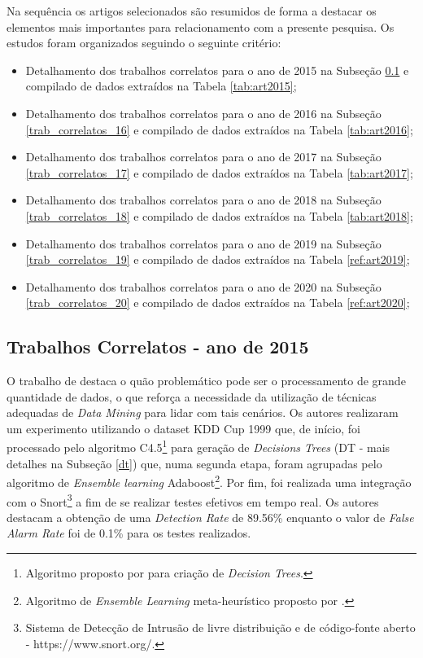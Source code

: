     
Na sequência os artigos selecionados são resumidos de forma a destacar os elementos mais importantes para relacionamento com a presente pesquisa. Os estudos foram organizados seguindo o seguinte critério:

\begin{itemize}
    \item Detalhamento dos trabalhos correlatos para o ano de 2015 na Subseção \ref{trab_correlatos_15} e compilado de dados extraídos na Tabela \ref{tab:art2015};
    

    \item Detalhamento dos trabalhos correlatos para o ano de 2016 na Subseção \ref{trab_correlatos_16} e compilado de dados extraídos na Tabela \ref{tab:art2016};
    
    \item Detalhamento dos trabalhos correlatos para o ano de 2017 na Subseção \ref{trab_correlatos_17} e compilado de dados extraídos na Tabela \ref{tab:art2017};
    
    \item Detalhamento dos trabalhos correlatos para o ano de 2018 na Subseção \ref{trab_correlatos_18} e compilado de dados extraídos na Tabela \ref{tab:art2018};
    
    \item Detalhamento dos trabalhos correlatos para o ano de 2019 na Subseção \ref{trab_correlatos_19} e compilado de dados extraídos na Tabela \ref{ref:art2019};
    
    \item Detalhamento dos trabalhos correlatos para o ano de 2020 na Subseção \ref{trab_correlatos_20} e compilado de dados extraídos na Tabela \ref{ref:art2020};
    
    
\end{itemize}
    
\subsection{Trabalhos Correlatos - ano de 2015}
\label{trab_correlatos_15}

O trabalho de  destaca o quão problemático pode ser o processamento de grande quantidade de dados, o que reforça a necessidade da utilização de técnicas adequadas de \textit{Data Mining} para lidar com tais cenários. Os autores realizaram um experimento utilizando o dataset KDD Cup 1999 que, de início, foi processado pelo algoritmo C4.5\footnote{Algoritmo proposto por  para criação de \textit{Decision Trees}.} para geração de \textit{Decisions Trees} (DT - mais detalhes na Subseção \ref{dt}) que, numa segunda etapa, foram agrupadas pelo algoritmo de \textit{Ensemble learning} Adaboost\footnote{Algoritmo de \textit{Ensemble Learning} meta-heurístico proposto por .}. Por fim, foi realizada uma integração com o Snort\footnote{Sistema de Detecção de Intrusão de livre distribuição e de código-fonte aberto - https://www.snort.org/.} a fim de se realizar testes efetivos em tempo real. Os autores destacam a obtenção de uma \textit{Detection Rate} de 89.56\% enquanto o valor de \textit{False Alarm Rate} foi de 0.1\% para os testes realizados.

